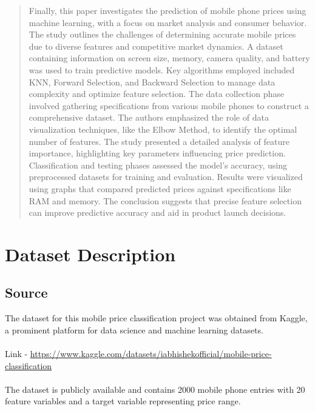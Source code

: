 \documentclass[12pt]{report}
\begin{document}
\begin{quotation}
  Finally, this paper \cite{kumuda2021} investigates the prediction of mobile phone prices using machine learning, with a focus on market analysis and consumer behavior. The study outlines the challenges of determining accurate mobile prices due to diverse features and competitive market dynamics. A dataset containing information on screen size, memory, camera quality, and battery was used to train predictive models. Key algorithms employed included KNN, Forward Selection, and Backward Selection to manage data complexity and optimize feature selection. The data collection phase involved gathering specifications from various mobile phones to construct a comprehensive dataset. The authors emphasized the role of data visualization techniques, like the Elbow Method, to identify the optimal number of features. The study presented a detailed analysis of feature importance, highlighting key parameters influencing price prediction. Classification and testing phases assessed the model's accuracy, using preprocessed datasets for training and evaluation. Results were visualized using graphs that compared predicted prices against specifications like RAM and memory. The conclusion suggests that precise feature selection can improve predictive accuracy and aid in product launch decisions.
\end{quotation}


\chapter{Dataset Description}
\section{Source}
The dataset for this mobile price classification project was obtained from Kaggle, a prominent platform for data science and machine learning datasets.\\ \\
Link - \href{https://www.kaggle.com/datasets/iabhishekofficial/mobile-price-classification?select=train.csv}{https://www.kaggle.com/datasets/iabhishekofficial/mobile-price-classification}\\ \\
The dataset is publicly available and contains 2000 mobile phone entries with 20 feature variables and a target variable representing price range.
\end{document}
